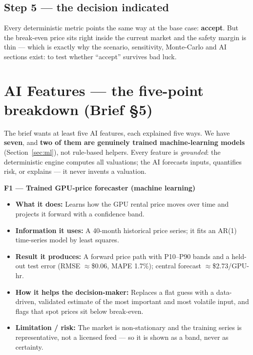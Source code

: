 \documentclass[11pt,a4paper]{article}
\begin{document}
\subsection{Step 5 --- the decision indicated}
Every deterministic metric points the same way at the base case: \textbf{accept}. But the break-even
price sits right inside the current market and the safety margin is thin --- which is exactly why the
scenario, sensitivity, Monte-Carlo and AI sections exist: to test whether ``accept'' survives bad luck.

\section{AI Features --- the five-point breakdown (Brief \S5)}
The brief wants at least five AI features, each explained five ways. We have \textbf{seven}, and
\textbf{two of them are genuinely trained machine-learning models} (Section~\ref{sec:ml}), not
rule-based helpers. Every feature is \emph{grounded}: the deterministic engine computes all
valuations; the AI forecasts inputs, quantifies risk, or explains --- it never invents a valuation.

\newcommand{\feat}[6]{%
  \medskip\noindent\textbf{#1}\par
  \begin{itemize}[leftmargin=1.4em,itemsep=1pt,topsep=1pt]
    \item \textbf{What it does:} #2
    \item \textbf{Information it uses:} #3
    \item \textbf{Result it produces:} #4
    \item \textbf{How it helps the decision-maker:} #5
    \item \textbf{Limitation / risk:} #6
  \end{itemize}}

\feat{F1 --- Trained GPU-price forecaster (machine learning)}
{Learns how the GPU rental price moves over time and projects it forward with a confidence band.}
{A 40-month historical price series; it fits an AR(1) time-series model by least squares.}
{A forward price path with P10--P90 bands and a held-out test error (RMSE $\approx$\$0.06, MAPE 1.7\%);
central forecast $\approx$\$2.73/GPU-hr.}
{Replaces a flat guess with a data-driven, validated estimate of the most important and most volatile
input, and flags that spot prices sit below break-even.}
{The market is non-stationary and the training series is representative, not a licensed feed --- so it
is shown as a band, never as certainty.}
\end{document}

